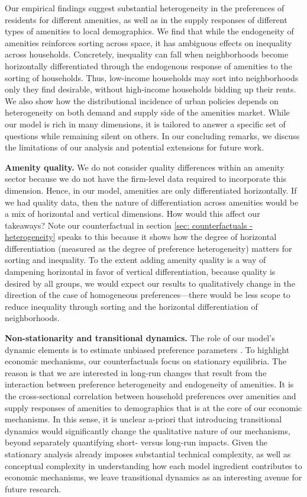 \documentclass[11pt]{article}
\newcommand{\Paragraph}{\vspace{0.1cm}\noindent\textbf}
\begin{document}
Our empirical findings suggest substantial heterogeneity in the preferences of residents for different amenities, as well as in the supply responses of different types of amenities to local demographics. We find that while the endogeneity of amenities reinforces sorting across space, it has ambiguous effects on inequality across households. Concretely, inequality can fall when neighborhoods become horizontally differentiated through the endogenous response of amenities to the sorting of households. Thus, low-income households may sort into neighborhoods only they find desirable, without high-income households bidding up their rents. We also show how the distributional incidence of urban policies depends on heterogeneity on both demand and supply side of the amenities market. While our model is rich in many dimensions, it is tailored to answer a specific set of questions while remaining silent on others. In our concluding remarks, we discuss the limitations of our analysis and potential extensions for future work.

\Paragraph{Amenity quality.} We do not consider quality differences within an amenity sector because we do not have the firm-level data required to incorporate this dimension. Hence, in our model, amenities are only differentiated horizontally. If we had quality data, then the nature of differentiation across amenities would be a mix of horizontal and vertical dimensions. How would this affect our takeaways? Note our counterfactual in section \ref{sec: counterfactuals - heterogeneity} speaks to this because it shows how the degree of horizontal differentiation (measured as the degree of preference heterogeneity) matters for sorting and inequality. To the extent adding amenity quality is a way of dampening horizontal in favor of vertical differentiation, because quality is desired by all groups, we would expect our results to qualitatively change in the direction of the case of homogeneous preferences---there would be less scope to reduce inequality through sorting and the horizontal differentiation of neighborhoods.

\Paragraph{Non-stationarity and transitional dynamics.} The role of our model's dynamic elements is to estimate unbiased preference parameters \citep{bayer2016dynamic,traiberman2019occupations}. To highlight economic mechanisms, our counterfactuals focus on stationary equilibria. The reason is that we are interested in long-run changes that result from the interaction between preference heterogeneity and endogeneity of amenities. It is the cross-sectional correlation between household preferences over amenities and supply responses of amenities to demographics that is at the core of our economic mechanisms. In this sense, it is unclear a-priori that introducing transitional dynamics would significantly change the qualitative nature of our mechanisms, beyond separately quantifying short- versus long-run impacts. Given the stationary analysis already imposes substantial technical complexity, as well as conceptual complexity in understanding how each model ingredient contributes to economic mechanisms, we leave transitional dynamics as an interesting avenue for future research.
\end{document}
